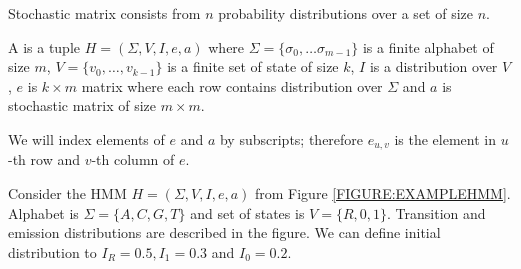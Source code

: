 \begin{note}
Stochastic matrix consists from $n$ probability distributions over a set of size $n$.
\end{note}

\begin{definition}\label{DEF:HMM}
A  is a tuple $H=(\Sigma,V,I,e,a)$ where
$\Sigma=\{\sigma_0,\dots\sigma_{m-1}\}$ is a finite alphabet of size $m$,
$V=\{v_0,\dots,v_{k-1}\}$ is a finite set of state of size $k$, $I$ is
a distribution over $V$, $e$ is $k\times m$ matrix where each row contains
distribution over $\Sigma$ and $a$ is stochastic matrix of size $m\times m$.

We will index elements of $e$ and $a$ by subscripts; therefore $e_{u,v}$ is
the element in $u$-th row and $v$-th column of $e$.  

\end{definition}

\begin{example}\label{EXAMPLE:EXAMPLEHMM} Consider the HMM $H=(\Sigma,V,I,e,a)$ from Figure
\ref{FIGURE:EXAMPLEHMM}.  Alphabet is $\Sigma=\{A,C,G,T\}$ and set of states is
$V=\{R,0,1\}$.  Transition and emission distributions are described in the figure.
We can define initial distribution to $I_R=0.5, I_1=0.3$ and $I_{0}=0.2$.
\end{example}

